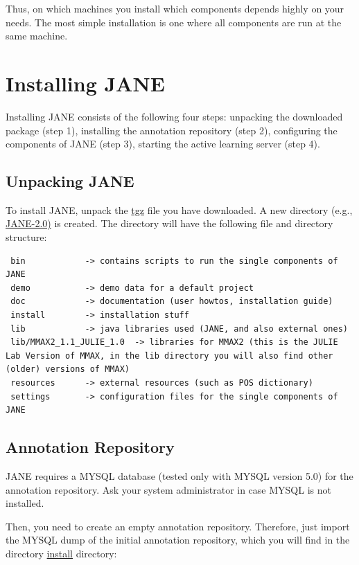 \documentclass[DIV12,english,11pt,halfparskip]{scrartcl}
\begin{document}
Thus, on which machines you install which components depends highly on
your needs. The most simple installation is one where all components
are run at the same machine.




\section{Installing JANE}
\label{sec:installation}

Installing JANE consists of the following four steps: unpacking the
downloaded package (step 1), installing the annotation repository
(step 2), configuring the components of JANE (step 3), starting the
active learning server (step 4).




\subsection{Unpacking JANE}

To install JANE, unpack the \url{tgz} file you have downloaded.  A new
directory (e.g., \url{JANE-2.0)} is created. The directory will have
the following file and directory structure:

\begin{verbatim}
 bin            -> contains scripts to run the single components of JANE
 demo           -> demo data for a default project
 doc            -> documentation (user howtos, installation guide)
 install        -> installation stuff 
 lib            -> java libraries used (JANE, and also external ones)
 lib/MMAX2_1.1_JULIE_1.0  -> libraries for MMAX2 (this is the JULIE
Lab Version of MMAX, in the lib directory you will also find other
(older) versions of MMAX)
 resources      -> external resources (such as POS dictionary)
 settings       -> configuration files for the single components of JANE
\end{verbatim}


\subsection{Annotation Repository}
\label{ss:install_annorep}

\textsc{JANE} requires a MYSQL database (tested only with MYSQL
version 5.0) for the annotation repository.  Ask your system
administrator in case MYSQL is not installed.

Then, you need to create an empty annotation repository. Therefore,
just import the MYSQL dump of the initial annotation repository, which
you will find in the directory \url{install} directory:
\end{document}
